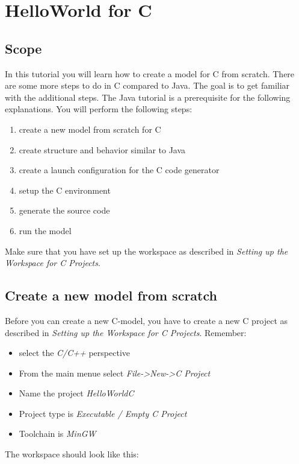 \section{HelloWorld for C}

\subsection{Scope}

In this tutorial you will learn how to create a model for C from scratch. There are some more steps to do 
in C compared to Java. The goal is to get familiar with the additional steps. The Java tutorial is a 
prerequisite for the following explanations. 
You will perform the following steps:

\begin{enumerate}
\item create a new model from scratch for C
\item create structure and behavior similar to Java
\item create a launch configuration for the C code generator
\item setup the C environment
\item generate the source code
\item run the model
\end{enumerate}

Make sure that you have set up the workspace as described in \textit{Setting up the Workspace for C 
Projects}.


\subsection{Create a new model from scratch}

Before you can create a new C-model, you have to create a new C project as described in \textit{Setting up 
the Workspace for C Projects}.
Remember:
\begin{itemize}
\item select the \textit{C/C++} perspective
\item From the main menue select \textit{File->New->C Project}
\item Name the project \textit{HelloWorldC}
\item Project type is \textit{Executable / Empty C Project}
\item Toolchain is \textit{MinGW}
\end{itemize}

The workspace should look like this:

